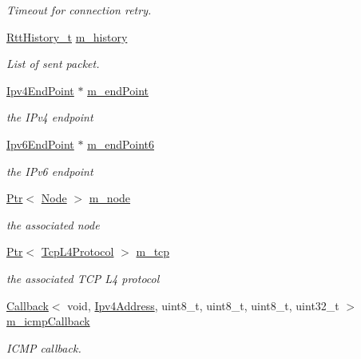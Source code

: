 \begin{DoxyCompactItemize}
\begin{DoxyCompactList}\small\item\em Timeout for connection retry. \end{DoxyCompactList}\item 
\hyperlink{namespacens3_a04f92e99d963a2e9abc4df951063fdcc}{Rtt\+History\+\_\+t} \hyperlink{classns3_1_1TcpSocketBase_a6d6853c108db3acb5b43ee855bd1f805}{m\+\_\+history}
\begin{DoxyCompactList}\small\item\em List of sent packet. \end{DoxyCompactList}\item 
\hyperlink{classns3_1_1Ipv4EndPoint}{Ipv4\+End\+Point} $\ast$ \hyperlink{classns3_1_1TcpSocketBase_a78a4181c0a7394749110ea6b194de467}{m\+\_\+end\+Point}
\begin{DoxyCompactList}\small\item\em the I\+Pv4 endpoint \end{DoxyCompactList}\item 
\hyperlink{classns3_1_1Ipv6EndPoint}{Ipv6\+End\+Point} $\ast$ \hyperlink{classns3_1_1TcpSocketBase_ab4b114c3959ee672b4fc9b7a90540dba}{m\+\_\+end\+Point6}
\begin{DoxyCompactList}\small\item\em the I\+Pv6 endpoint \end{DoxyCompactList}\item 
\hyperlink{classns3_1_1Ptr}{Ptr}$<$ \hyperlink{classns3_1_1Node}{Node} $>$ \hyperlink{classns3_1_1TcpSocketBase_abefd2b9f439fe5d0deef93ee68884a1e}{m\+\_\+node}
\begin{DoxyCompactList}\small\item\em the associated node \end{DoxyCompactList}\item 
\hyperlink{classns3_1_1Ptr}{Ptr}$<$ \hyperlink{classns3_1_1TcpL4Protocol}{Tcp\+L4\+Protocol} $>$ \hyperlink{classns3_1_1TcpSocketBase_a26b979e55b02e0aed76cb84c39a66bc7}{m\+\_\+tcp}
\begin{DoxyCompactList}\small\item\em the associated T\+CP L4 protocol \end{DoxyCompactList}\item 
\hyperlink{classns3_1_1Callback}{Callback}$<$ void, \hyperlink{classns3_1_1Ipv4Address}{Ipv4\+Address}, uint8\+\_\+t, uint8\+\_\+t, uint8\+\_\+t, uint32\+\_\+t $>$ \hyperlink{classns3_1_1TcpSocketBase_aef792b929bd15886a4b9a7132525a0ea}{m\+\_\+icmp\+Callback}
\begin{DoxyCompactList}\small\item\em I\+C\+MP callback. \end{DoxyCompactList}\item 

\end{DoxyCompactItemize}
